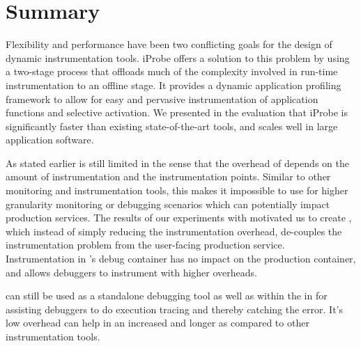 \section{Summary}
\label{sec:iProbeSummary}

Flexibility and performance have been two conflicting goals for the design of dynamic instrumentation tools.
iProbe offers a solution to this problem by using a two-stage process that offloads much of the complexity involved in run-time instrumentation to an offline stage. 
It provides a dynamic application profiling framework to allow for easy and pervasive instrumentation of application functions
and selective activation. 
We presented in the evaluation that iProbe is significantly faster than existing state-of-the-art tools, and scales well in large application software.

As stated earlier \iprobe is still limited in the sense that the overhead of \iprobe depends on the amount of instrumentation and the instrumentation points.
Similar to other monitoring and instrumentation tools, this makes it impossible to use for higher granularity monitoring or debugging scenarios which can potentially impact production services. 
The results of our experiments with \iprobe motivated us to create \parikshan, which instead of simply reducing the instrumentation overhead, de-couples the instrumentation problem from the user-facing production service.
Instrumentation in \parikshan's debug container has no impact on the production container, and allows debuggers to instrument with higher overheads.

\iprobe can still be used as a standalone debugging tool as well as within the \debugcontainer in \parikshan for assisting debuggers to do execution tracing and thereby catching the error.
It's low overhead can help in an increased and longer \debugwindow as compared to other instrumentation tools.


